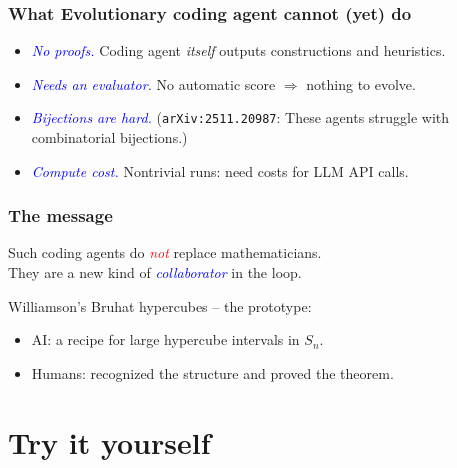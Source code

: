 \documentclass{beamer}
\theoremstyle{definition}
\newcommand\remph[1]{\emph{\textcolor{red}{#1}}}
\newcommand\bemph[1]{\emph{\textcolor{blue}{#1}}}
\begin{document}
\begin{frame}
  \frametitle{What Evolutionary coding agent cannot (yet) do}
  \pause
  \begin{itemize}
    \item[$\bullet$] \bemph{No proofs.} Coding agent \emph{itself} outputs
      constructions and heuristics.
      \pause
      \vspace{.2cm}
    \item[$\bullet$] \bemph{Needs an evaluator.} No automatic score
      \(\Rightarrow\) nothing to evolve.
      \pause
      \vspace{.2cm}
    \item[$\bullet$] \bemph{Bijections are hard.} (\texttt{arXiv:2511.20987}:
      These agents struggle with combinatorial bijections.)
      \pause
      \vspace{.2cm}
    \item[$\bullet$] \bemph{Compute cost.} Nontrivial runs: need costs for LLM API calls.
  \end{itemize}
\end{frame}


\begin{frame}
  \frametitle{The message}
  \pause
  \begin{center}
    \large
    Such coding agents do \remph{not} replace mathematicians. \\
    \pause
    \vspace{.4cm}
    They are a new kind of \bemph{collaborator} in the loop.
  \end{center}
  \pause
  \vspace{.5cm}

  Williamson's Bruhat hypercubes -- the prototype:
  \begin{itemize}
    \item[$\bullet$] AI: a recipe for large hypercube intervals in \( S_n \).
      \pause
    \item[$\bullet$] Humans: recognized the structure and proved the theorem.
  \end{itemize}
\end{frame}


\section{Try it yourself}
\end{document}
